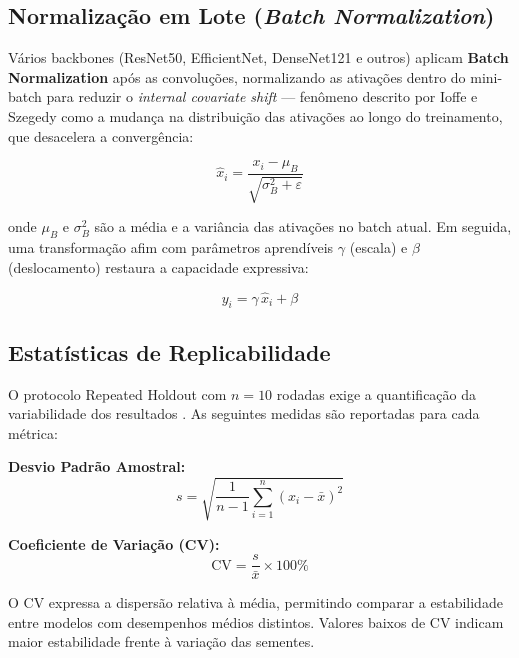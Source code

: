 \documentclass[12pt,a4paper]{article}
\begin{document}
\subsection{Normalização em Lote (\textit{Batch Normalization})}

Vários backbones (ResNet50, EfficientNet, DenseNet121 e outros) aplicam
\textbf{Batch Normalization} \cite{ioffe2015batch} após as convoluções,
normalizando as ativações dentro do mini-batch para reduzir o
\emph{internal covariate shift} --- fenômeno descrito por Ioffe e Szegedy
\cite{ioffe2015batch} como a mudança na distribuição das ativações ao longo
do treinamento, que desacelera a convergência:

\begin{equation}
  \hat{x}_i = \frac{x_i - \mu_B}{\sqrt{\sigma_B^2 + \varepsilon}}
  \label{eq:bn_norm}
\end{equation}

onde $\mu_B$ e $\sigma_B^2$ são a média e a variância das ativações no
batch atual. Em seguida, uma transformação afim com parâmetros aprendíveis
$\gamma$ (escala) e $\beta$ (deslocamento) restaura a capacidade expressiva:

\begin{equation}
  y_i = \gamma\,\hat{x}_i + \beta
  \label{eq:bn_affine}
\end{equation}

\subsection{Estatísticas de Replicabilidade}

O protocolo Repeated Holdout com $n = 10$ rodadas exige a quantificação da
variabilidade dos resultados \cite{dietterich1998approximate,bouckaert2004evaluating}.
As seguintes medidas são reportadas para cada métrica:

\textbf{Desvio Padrão Amostral:}
\begin{equation}
  s = \sqrt{\frac{1}{n-1}\sum_{i=1}^{n}(x_i - \bar{x})^2}
  \label{eq:std}
\end{equation}

\textbf{Coeficiente de Variação (CV):}
\begin{equation}
  \mathrm{CV} = \frac{s}{\bar{x}}\times 100\%
  \label{eq:cv}
\end{equation}

O CV expressa a dispersão relativa à média, permitindo comparar a estabilidade
entre modelos com desempenhos médios distintos. Valores baixos de CV indicam
maior estabilidade frente à variação das sementes.
\end{document}
